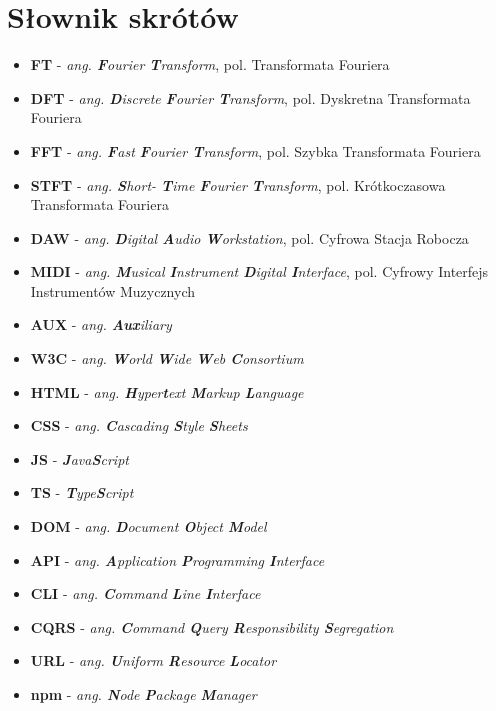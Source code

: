 \documentclass[12pt,a4paper,twoside]{mwart}
\begin{document}
\section{Słownik skrótów}
\begin{itemize}
  \item \textbf{FT} - \textit{ang. \textbf{F}ourier \textbf{T}ransform}, pol. Transformata Fouriera
  \item \textbf{DFT} - \textit{ang. \textbf{D}iscrete \textbf{F}ourier \textbf{T}ransform}, pol. Dyskretna Transformata Fouriera
  \item \textbf{FFT} - \textit{ang. \textbf{F}ast \textbf{F}ourier \textbf{T}ransform}, pol. Szybka Transformata Fouriera
  \item \textbf{STFT} - \textit{ang. \textbf{S}hort- \textbf{T}ime \textbf{F}ourier \textbf{T}ransform}, pol. Krótkoczasowa Transformata Fouriera
  \item \textbf{DAW} - \textit{ang. \textbf{D}igital \textbf{A}udio \textbf{W}orkstation}, pol. Cyfrowa Stacja Robocza 
  \item \textbf{MIDI} - \textit{ang. \textbf{M}usical \textbf{I}nstrument \textbf{D}igital \textbf{I}nterface}, pol. Cyfrowy Interfejs Instrumentów Muzycznych
  \item \textbf{AUX} - \textit{ang. \textbf{Aux}iliary}
  \item \textbf{W3C} - \textit{ang. \textbf{W}orld \textbf{W}ide \textbf{W}eb \textbf{C}onsortium}
  \item \textbf{HTML} - \textit{ang. \textbf{H}yper\textbf{t}ext \textbf{M}arkup \textbf{L}anguage}
  \item \textbf{CSS} - \textit{ang.  \textbf{C}ascading \textbf{S}tyle \textbf{S}heets}
  \item \textbf{JS} - \textit{\textbf{J}ava\textbf{S}cript}
  \item \textbf{TS} - \textit{\textbf{T}ype\textbf{S}cript}
  \item \textbf{DOM} - \textit{ang. \textbf{D}ocument \textbf{O}bject \textbf{M}odel}
  \item \textbf{API} - \textit{ang. \textbf{A}pplication \textbf{P}rogramming \textbf{I}nterface}
  \item \textbf{CLI} - \textit{ang. \textbf{C}ommand \textbf{L}ine \textbf{I}nterface}
  \item \textbf{CQRS} - \textit{ang. \textbf{C}ommand \textbf{Q}uery \textbf{R}esponsibility \textbf{S}egregation}
  \item \textbf{URL} - \textit{ang. \textbf{U}niform \textbf{R}esource \textbf{L}ocator }
  \item \textbf{npm} - \textit{ang. \textbf{N}ode \textbf{P}ackage \textbf{M}anager}

\end{itemize}
\newpage
\setcounter{secnumdepth}{2}
\end{document}
